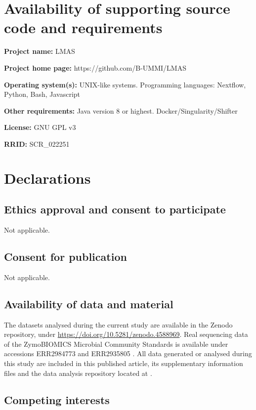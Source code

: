 \section{Availability of supporting source code and requirements}

\textbf{Project name:} LMAS

\textbf{Project home page: }https://github.com/B-UMMI/LMAS 

\textbf{Operating system(s):} UNIX-like systems.
Programming languages: Nextflow, Python, Bash, Javascript

\textbf{Other requirements: }Java version 8 or highest. Docker/Singularity/Shifter

\textbf{License: } GNU GPL v3

\textbf{RRID:} SCR\_022251


\section{Declarations}

\subsection{Ethics approval and consent to participate}

Not applicable.

\subsection{Consent for publication}

Not applicable.

\subsection{Availability of data and material}

The datasets analysed during the current study are available in the Zenodo repository, under \url{https://doi.org/10.5281/zenodo.4588969}. Real sequencing data of the ZymoBIOMICS Microbial Community Standards is available under accessions ERR2984773 and ERR2935805 \cite{nicholls_ultra-deep_2019}. All data generated or analysed during this study are included in this published article, its supplementary information files and the data analysis repository located at \cite{noauthor_lmas_2022}.

\subsection{Competing interests}

